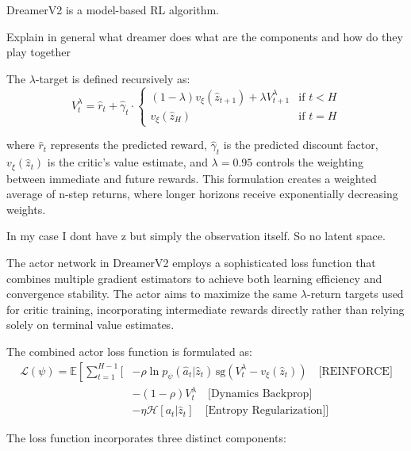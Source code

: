 \documentclass[
	english,
	ruledheaders=section,
	class=report,
	thesis={type=master},
	accentcolor=9c,
	custommargins=true,
	marginpar=false,
	parskip=half-,
	fontsize=11pt,
]{tudapub}
\begin{document}
DreamerV2 \cite{hafner2019dreamer} is a model-based RL algorithm.

Explain in general what dreamer does what are the components and how do they
play together

The $\lambda$-target is defined recursively as:
\begin{equation}
	V^{\lambda}_t = \hat{r}_t + \hat{\gamma}_t \cdot \begin{cases}
		(1 - \lambda)v_\xi(\hat{z}_{t+1}) + \lambda V^{\lambda}_{t+1} & \text{if } t < H \\
		v_\xi(\hat{z}_H)                                              & \text{if } t = H
	\end{cases}
\end{equation}

where $\hat{r}_t$ represents the predicted reward, $\hat{\gamma}_t$ is the
predicted discount factor, $v_\xi(\hat{z}_t)$ is the critic's value estimate,
and $\lambda = 0.95$ controls the weighting between immediate and future
rewards. This formulation creates a weighted average of n-step returns, where
longer horizons receive exponentially decreasing weights.

In my case I dont have z but simply the observation itself. So no latent space.

The actor network in DreamerV2 employs a sophisticated loss function that
combines multiple gradient estimators to achieve both learning efficiency and
convergence stability. The actor aims to maximize the same $\lambda$-return
targets used for critic training, incorporating intermediate rewards directly
rather than relying solely on terminal value estimates.

The combined actor loss function is formulated as:
\begin{align}
	\mathcal{L}(\psi) = \mathbb{E}\left[\sum_{t=1}^{H-1} \Big[\right. & -\rho \ln p_\psi(\hat{a}_t | \hat{z}_t) \, \text{sg}(V^{\lambda}_t - v_\xi(\hat{z}_t)) \quad \text{[REINFORCE]} \\
	                                                                  & -(1-\rho)V^{\lambda}_t \quad \text{[Dynamics Backprop]}                                                         \\
	                                                                  & -\eta \mathcal{H}[a_t|\hat{z}_t] \quad \text{[Entropy Regularization]} \Big]
\end{align}

The loss function incorporates three distinct components:
\end{document}
